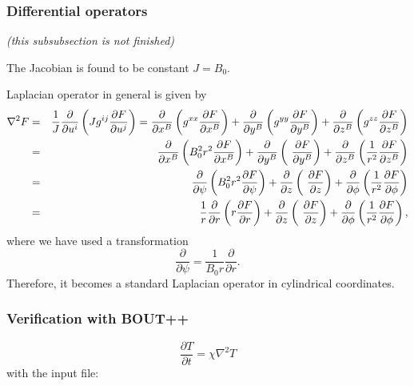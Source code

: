 \documentclass[11pt, oneside]{article}
\begin{document}
\subsubsection{Differential operators}
\emph{(this subsubsection is not finished)}


The Jacobian is found to be constant $J = B_0$.

Laplacian operator in general is given by
\begin{eqnarray*}
\nabla ^{2}F &=&\frac{1}{J}\frac{\partial }{\partial u^{i}}\left( Jg^{ij}%
\frac{\partial F}{\partial u^{j}}\right) =\frac{\partial }{\partial x^{B}}%
\left( g^{xx}\frac{\partial F}{\partial x^{B}}\right) +\frac{\partial }{%
\partial y^{B}}\left( g^{yy}\frac{\partial F}{\partial y^{B}}\right) +\frac{%
\partial }{\partial z^{B}}\left( g^{zz}\frac{\partial F}{\partial z^{B}}%
\right) \\
&=&\frac{\partial }{\partial x^{B}}\left( B_{0}^{2}r^{2}\frac{\partial F}{%
\partial x^{B}}\right) +\frac{\partial }{\partial y^{B}}\left( \ \frac{%
\partial F}{\partial y^{B}}\right) +\frac{\partial }{\partial z^{B}}\left(
\frac{1}{r^{2}}\frac{\partial F}{\partial z^{B}}\right) \\
&=&\frac{\partial }{\partial \psi }\left( B_{0}^{2}r^{2}\frac{\partial F}{%
\partial \psi }\right) +\frac{\partial }{\partial z}\left( \ \frac{\partial F%
}{\partial z}\right) +\frac{\partial }{\partial \phi }\left( \frac{1}{r^{2}}%
\frac{\partial F}{\partial \phi }\right) \\
&=&\frac{1}{r}\frac{\partial }{\partial r }\left( r\frac{\partial F}{%
\partial r}\right) +\frac{\partial }{\partial z}\left( \ \frac{\partial F%
}{\partial z}\right) +\frac{\partial }{\partial \phi }\left( \frac{1}{r^{2}}%
\frac{\partial F}{\partial \phi }\right),
\end{eqnarray*}
where we have used a transformation
\begin{equation*}
\frac{\partial}{\partial \psi} = \frac{1}{B_0 r} \frac{\partial}{\partial r}.
\end{equation*}
Therefore, it becomes a standard Laplacian operator in cylindrical coordinates.


\subsubsection{Verification with BOUT++}
\begin{equation}
\frac{\partial T}{\partial t} = \chi \nabla^2 T
\end{equation}
with the input file:
\end{document}
